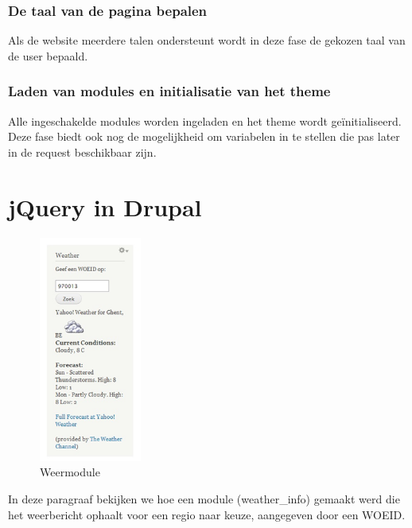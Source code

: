 \subsubsection{De taal van de pagina bepalen}
Als de website meerdere talen ondersteunt wordt in deze fase de gekozen taal van de user bepaald.

\subsubsection{Laden van modules en initialisatie van het theme}
Alle ingeschakelde modules worden ingeladen en het theme wordt ge\"{i}nitialiseerd. Deze fase biedt ook nog de mogelijkheid om variabelen in te stellen die pas later in de request beschikbaar zijn.

\newpage

\section{jQuery in Drupal}

\begin{figure}
\vspace{-40pt}
\hspace{-10pt}
\centering
\includegraphics[width=0.3\textwidth]{fig/weermodule}
\vspace{-30pt}
\hspace{-10pt}
\centering
\caption{Weermodule}
\label{fig:weermodule}
\vspace{-70pt}
\end{figure}

In deze paragraaf bekijken we hoe een module (weather\_info) gemaakt werd die het weerbericht ophaalt voor een regio naar keuze, aangegeven door een WOEID.

